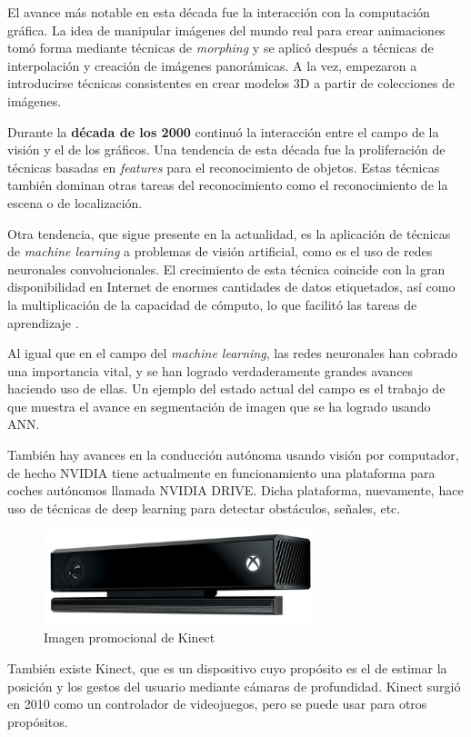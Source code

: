 El avance más notable en esta década fue la interacción con la computación gráfica. La idea de manipular imágenes del mundo real para crear animaciones tomó forma mediante técnicas de \textit{morphing} y se aplicó después a técnicas de interpolación y creación de imágenes panorámicas. A la vez, empezaron a introducirse técnicas consistentes en crear modelos 3D a partir de colecciones de imágenes.

Durante la \textbf{década de los 2000} continuó la interacción entre el campo de la visión y el de los gráficos. Una tendencia de esta década fue la proliferación de técnicas basadas en \textit{features} para el reconocimiento de objetos. Estas técnicas también dominan otras tareas del reconocimiento como el reconocimiento de la escena o de localización.

Otra tendencia, que sigue presente en la actualidad, es la aplicación de técnicas de \textit{machine learning} a problemas de visión artificial, como es el uso de redes neuronales convolucionales. El crecimiento de esta técnica coincide con la gran disponibilidad en Internet de enormes cantidades de datos etiquetados, así como la multiplicación de la capacidad de cómputo, lo que facilitó las tareas de aprendizaje \citep{book:szeliski}.

Al igual que en el campo del \textit{machine learning}, las redes neuronales han cobrado una importancia vital, y se han logrado verdaderamente grandes avances haciendo uso de ellas. Un ejemplo del estado actual del campo es el trabajo de \citet{art:2017arXiv170306870H} que muestra el avance en segmentación de imagen que se ha logrado usando ANN.

También hay avances en la conducción autónoma usando visión por computador, de hecho NVIDIA tiene actualmente en funcionamiento una plataforma para coches autónomos llamada NVIDIA DRIVE. Dicha plataforma, nuevamente, hace uso de técnicas de deep learning para detectar obstáculos, señales, etc.

\begin{figure}
    \centering
    \label{fig:kinect}
    \includegraphics[width=0.7\textwidth]{images/kinect}
    \caption{Imagen promocional de Kinect}
\end{figure}

También existe Kinect, que es un dispositivo cuyo propósito es el de estimar la posición y los gestos del usuario mediante cámaras de profundidad. Kinect surgió en 2010 como un controlador de videojuegos, pero se puede usar para otros propósitos.
\newpage
